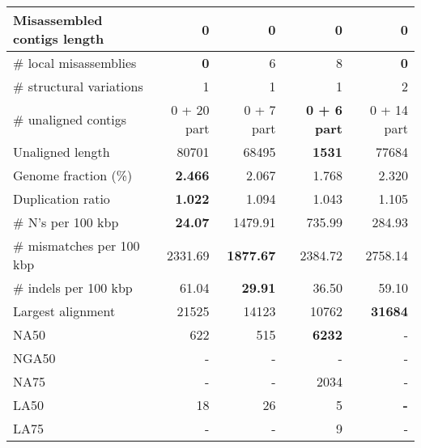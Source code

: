 \documentclass[12pt,a4paper]{article}
\begin{document}
\begin{table}[ht]
\begin{center}
\begin{tabular}{|l*{4}{|r}|}
Misassembled contigs length & 0 & 0 & 0 & 0 \\ \hline
\# local misassemblies & {\bf 0} & 6 & 8 & {\bf 0} \\ \hline
\# structural variations & 1 & 1 & 1 & 2 \\ \hline
\# unaligned contigs & 0 + 20 part & 0 + 7 part & {\bf 0 + 6 part} & 0 + 14 part \\ \hline
Unaligned length & 80701 & 68495 & {\bf 1531} & 77684 \\ \hline
Genome fraction (\%) & {\bf 2.466} & 2.067 & 1.768 & 2.320 \\ \hline
Duplication ratio & {\bf 1.022} & 1.094 & 1.043 & 1.105 \\ \hline
\# N's per 100 kbp & {\bf 24.07} & 1479.91 & 735.99 & 284.93 \\ \hline
\# mismatches per 100 kbp & 2331.69 & {\bf 1877.67} & 2384.72 & 2758.14 \\ \hline
\# indels per 100 kbp & 61.04 & {\bf 29.91} & 36.50 & 59.10 \\ \hline
Largest alignment & 21525 & 14123 & 10762 & {\bf 31684} \\ \hline
NA50 & 622 & 515 & {\bf 6232} & - \\ \hline
NGA50 & - & - & - & - \\ \hline
NA75 & - & - & 2034 & - \\ \hline
LA50 & 18 & 26 & 5 & {\bf -} \\ \hline
LA75 & - & - & 9 & - \\ \hline
\end{tabular}
\end{center}
\end{table}
\end{document}
